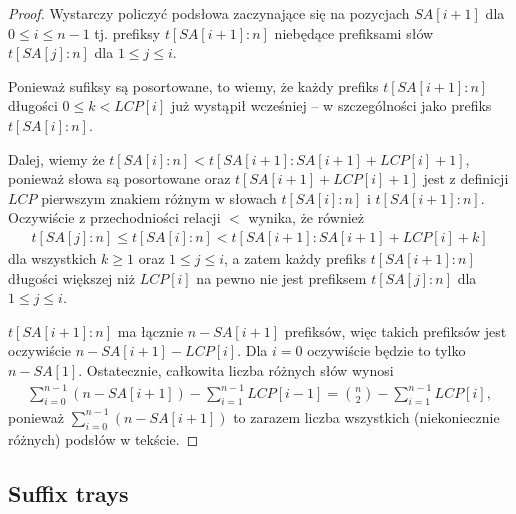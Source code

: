 \begin{proof}
  Wystarczy policzyć podsłowa zaczynające się na pozycjach $SA[i + 1]$ dla $0 \le i \le n - 1$ tj. prefiksy $t[SA[i + 1]:n]$ niebędące prefiksami słów $t[SA[j]:n]$ dla $1 \le j \le i$.
  
  Ponieważ sufiksy są posortowane, to wiemy, że każdy prefiks $t[SA[i + 1]:n]$ długości $0 \le k < LCP[i]$ już wystąpił wcześniej -- w szczególności jako prefiks $t[SA[i]:n]$.
  
  Dalej, wiemy że $t[SA[i]:n] < t[SA[i + 1]:SA[i + 1] + LCP[i] + 1]$, ponieważ słowa są posortowane oraz $t[SA[i + 1] + LCP[i] + 1]$ jest z definicji $LCP$ pierwszym znakiem różnym w słowach $t[SA[i]:n]$ i $t[SA[i + 1]:n]$. Oczywiście z przechodniości relacji $<$ wynika, że również
  \begin{align*}
    t[SA[j]:n] \le t[SA[i]:n] < t[SA[i + 1]:SA[i + 1] + LCP[i] + k]
  \end{align*}
  dla wszystkich $k \ge 1$ oraz $1 \le j \le i$, a zatem każdy prefiks $t[SA[i + 1]:n]$ długości większej niż $LCP[i]$ na pewno nie jest prefiksem $t[SA[j]:n]$ dla $1 \le j \le i$.
  
  $t[SA[i + 1]:n]$ ma łącznie $n - SA[i + 1]$ prefiksów, więc takich prefiksów jest oczywiście $n - SA[i + 1] - LCP[i]$. Dla $i = 0$ oczywiście będzie to tylko $n - SA[1]$.
  Ostatecznie, całkowita liczba różnych słów wynosi
  \begin{align*}
    \sum_{i = 0}^{n - 1} \left(n - SA[i + 1]\right) - \sum_{i = 1}^{n - 1} LCP[i - 1] = \binom{n}{2} - \sum_{i = 1}^{n - 1} LCP[i],
  \end{align*}
  ponieważ $\sum_{i = 0}^{n - 1} \left(n - SA[i + 1]\right)$ to zarazem liczba wszystkich (niekoniecznie różnych) podsłów w tekście.
\end{proof}

\subsection{Suffix trays}

